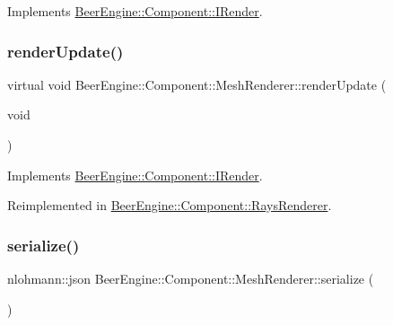 Implements \mbox{\hyperlink{class_beer_engine_1_1_component_1_1_i_render_a021864acc1288b34b13f8766735ebcc0}{Beer\+Engine\+::\+Component\+::\+I\+Render}}.

\mbox{\label{class_beer_engine_1_1_component_1_1_mesh_renderer_abca4caa865363fdccb1b0c6fc6f7c81d}} 
\subsubsection{\texorpdfstring{render\+Update()}{renderUpdate()}}
{\footnotesize\ttfamily virtual void Beer\+Engine\+::\+Component\+::\+Mesh\+Renderer\+::render\+Update (\begin{DoxyParamCaption}\item[{void}]{ }\end{DoxyParamCaption})\hspace{0.3cm}{\ttfamily [virtual]}}



Implements \mbox{\hyperlink{class_beer_engine_1_1_component_1_1_i_render_aef1ff4ddcdf216d290c747edd86bd99e}{Beer\+Engine\+::\+Component\+::\+I\+Render}}.



Reimplemented in \mbox{\hyperlink{class_beer_engine_1_1_component_1_1_rays_renderer_a1647c9a5f40fc9186ccb6d55b7ebfe5e}{Beer\+Engine\+::\+Component\+::\+Rays\+Renderer}}.

\mbox{\label{class_beer_engine_1_1_component_1_1_mesh_renderer_a65c6c22ae40b5b94f590c3a8bf14d0d0}} 
\subsubsection{\texorpdfstring{serialize()}{serialize()}}
{\footnotesize\ttfamily nlohmann\+::json Beer\+Engine\+::\+Component\+::\+Mesh\+Renderer\+::serialize (\begin{DoxyParamCaption}{ }\end{DoxyParamCaption})\hspace{0.3cm}{\ttfamily [virtual]}}



